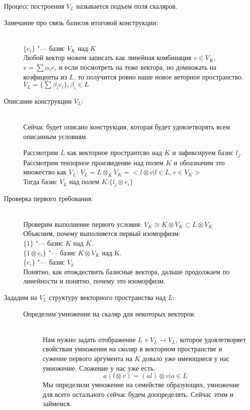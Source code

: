 \begin{description}
\begin{Def}
Процесс построения $V_L$ называется подъем поля скаляров.
\end{Def}
\begin{description}
    \item[Замечание про связь базисов итоговой конструкции:] \hfill \\
$\{e_i\}$ "--- базис $V_K$ над $K$\\
Любой вектор можем записать как линейная комбинация $v \in V_K$, 
$v = \sum \alpha_i e_i$ и если посмотреть на теже вектора, но домножать на 
коэфиценты из $L$, то получится ровно наше новое веторное пространство. 
$V_L  = \{\sum \beta_ie_i\}, \beta_i \in L$\\

    \item[Описание конструкции $V_L$:] \hfill \\
Сейчас будет описано конструкция, которая будет удовлетворять всем 
описанным условиям.

Рассмотрим $L$ как векторное пространтсво над $K$ и зафиксируем базис $l_j$.\\

Рассмотрим тензорное произведение над полем $K$ и обоазначим это множество как $V_L$:
$V_L = L \otimes_{K} V_K = < l \otimes v | l \in L, v \in V_K >$\\

Тогда базис $V_L$ над полем $K$:$\{l_j \otimes e_i\}$\\

   \item[Проверка первого требования:]\hfill \\
Проверим выполнение первого условия: $V_K \cong K \otimes V_K \subset L \otimes V_K$\\
Объясним, почему выполняется первый изоморфизм:\\
$\{1\}$ "--- базис $K$ над $K$.\\
$\{1 \otimes e_i\}$ "--- базис $K \otimes V_K$ над K.\\
$\{e_i\}$ "--- базис $V_k$\\
Понятно, как отождествить базисные вектора, дальше продолжаем по линейности и понятно, почему это 
изоморфизм.\\

    \item[Зададим на $V_L$ структуру векторного пространства над $L$:] \hfill
    \begin{description}
    \item[Определим умножение на скаляр для некоторых векторов:] \hfill \\
Нам нужно задать отображение $L \times V_L \to V_L$, которое удовлетворяет свойствам умножения на сколяр в 
векторном пространстве и сужение первого аргумента на $K$ довало уже имеющиеся у нас умножение. Сложение у нас уже есть.
$$a(l \otimes v) = (al) \otimes v | a \in L $$
Мы определили умножение на семействе образующих, умножение для всего остального сейчас будем доопределять.
Сейчас этим и займемся.


\end{description}
\end{description}
\end{description}
